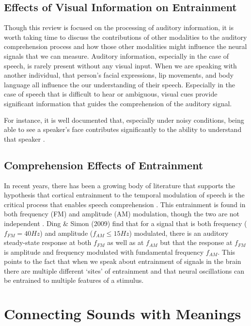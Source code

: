 \documentclass[titlepage]{article}
\begin{document}
  \subsection{Effects of Visual Information on Entrainment}

    Though this review is focused on the processing of auditory information, it is worth taking time
    to discuss the contributions of other modalities to the auditory comprehension process and how
    those other modalities might influence the neural signals that we can measure. Auditory information,
    especially in the case of speech, is rarely present without any visual input. When we are speaking
    with another individual, that person's facial expressions, lip movements, and body language all
    influence the our understanding of their speech. Especially in the case of speech that is
    difficult to hear or ambiguous, visual cues provide significant information that guides the
    comprehension of the auditory signal.

    For instance, it is well documented that, especially under noisy  conditions, being able to see
    a speaker's face contributes significantly to the ability to understand that speaker
    \cite{Sumby1954,Erber1969}.

  \subsection{Comprehension Effects of Entrainment}

    In recent years, there has been a growing body of literature that supports the hypothesis
    that cortical entrainment to the temporal modulation of speech is the critical process
    that enables speech comprehension \cite{Meyer2018,Morillon2015,ZionGolumbic2013,Doelling2014}.
    This entrainment is found in both frequency (FM) and amplitude (AM) modulation, though the
    two are not independent \cite{Ding2009}. Ding \& Simon (2009) \cite{Ding2009} find that for a signal that
    is both frequency ($f_{FM}=40Hz$) and amplitude ($f_{AM}\leq 15Hz$) modulated, there is an auditory
    steady-state response at both $f_{FM}$ as well as at $f_{AM}$ but that the response at $f_{FM}$ is
    amplitude and frequency modulated with fundamental frequency $f_{AM}$. This points to the fact that
    when we speak about entrainment of signals in the brain there are multiple different `sites' of entrainment
    and that neural oscillations can be entrained to multiple features of a stimulus.

\section{Connecting Sounds with Meanings} \label{meaning}
\end{document}
